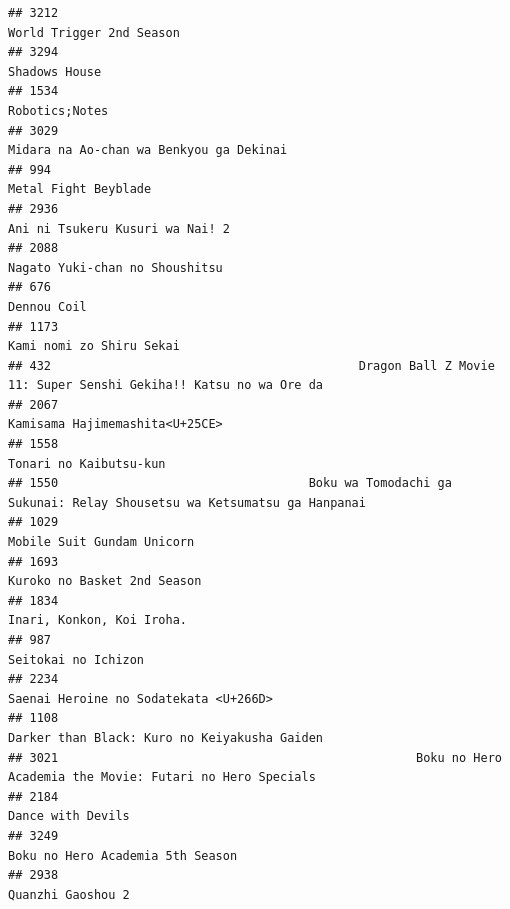 \documentclass[
]{article}
\begin{document}
\begin{verbatim}
## 3212                                                                                  World Trigger 2nd Season
## 3294                                                                                             Shadows House
## 1534                                                                                            Robotics;Notes
## 3029                                                                   Midara na Ao-chan wa Benkyou ga Dekinai
## 994                                                                                       Metal Fight Beyblade
## 2936                                                                           Ani ni Tsukeru Kusuri wa Nai! 2
## 2088                                                                            Nagato Yuki-chan no Shoushitsu
## 676                                                                                                Dennou Coil
## 1173                                                                                  Kami nomi zo Shiru Sekai
## 432                                           Dragon Ball Z Movie 11: Super Senshi Gekiha!! Katsu no wa Ore da
## 2067                                                                            Kamisama Hajimemashita<U+25CE>
## 1558                                                                                    Tonari no Kaibutsu-kun
## 1550                                   Boku wa Tomodachi ga Sukunai: Relay Shousetsu wa Ketsumatsu ga Hanpanai
## 1029                                                                                Mobile Suit Gundam Unicorn
## 1693                                                                               Kuroko no Basket 2nd Season
## 1834                                                                                 Inari, Konkon, Koi Iroha.
## 987                                                                                        Seitokai no Ichizon
## 2234                                                                     Saenai Heroine no Sodatekata <U+266D>
## 1108                                                              Darker than Black: Kuro no Keiyakusha Gaiden
## 3021                                                  Boku no Hero Academia the Movie: Futari no Hero Specials
## 2184                                                                                         Dance with Devils
## 3249                                                                          Boku no Hero Academia 5th Season
## 2938                                                                                         Quanzhi Gaoshou 2

\end{verbatim}
\end{document}
